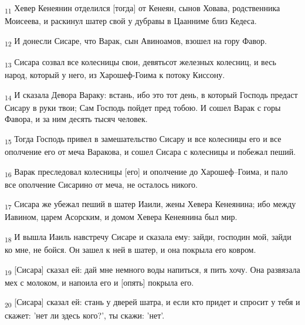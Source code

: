 \begin{tcolorbox}
\textsubscript{11} Хевер Кенеянин отделился [тогда] от Кенеян, сынов Ховава, родственника Моисеева, и раскинул шатер свой у дубравы в Цаанниме близ Кедеса.
\end{tcolorbox}
\begin{tcolorbox}
\textsubscript{12} И донесли Сисаре, что Варак, сын Авиноамов, взошел на гору Фавор.
\end{tcolorbox}
\begin{tcolorbox}
\textsubscript{13} Сисара созвал все колесницы свои, девятьсот железных колесниц, и весь народ, который у него, из Харошеф-Гоима к потоку Киссону.
\end{tcolorbox}
\begin{tcolorbox}
\textsubscript{14} И сказала Девора Вараку: встань, ибо это тот день, в который Господь предаст Сисару в руки твои; Сам Господь пойдет пред тобою. И сошел Варак с горы Фавора, и за ним десять тысяч человек.
\end{tcolorbox}
\begin{tcolorbox}
\textsubscript{15} Тогда Господь привел в замешательство Сисару и все колесницы его и все ополчение его от меча Варакова, и сошел Сисара с колесницы и побежал пеший.
\end{tcolorbox}
\begin{tcolorbox}
\textsubscript{16} Варак преследовал колесницы [его] и ополчение до Харошеф--Гоима, и пало все ополчение Сисарино от меча, не осталось никого.
\end{tcolorbox}
\begin{tcolorbox}
\textsubscript{17} Сисара же убежал пеший в шатер Иаили, жены Хевера Кенеянина; ибо между Иавином, царем Асорским, и домом Хевера Кенеянина был мир.
\end{tcolorbox}
\begin{tcolorbox}
\textsubscript{18} И вышла Иаиль навстречу Сисаре и сказала ему: зайди, господин мой, зайди ко мне, не бойся. Он зашел к ней в шатер, и она покрыла его ковром.
\end{tcolorbox}
\begin{tcolorbox}
\textsubscript{19} [Сисара] сказал ей: дай мне немного воды напиться, я пить хочу. Она развязала мех с молоком, и напоила его и [опять] покрыла его.
\end{tcolorbox}
\begin{tcolorbox}
\textsubscript{20} [Сисара] сказал ей: стань у дверей шатра, и если кто придет и спросит у тебя и скажет: 'нет ли здесь кого?', ты скажи: 'нет'.
\end{tcolorbox}

